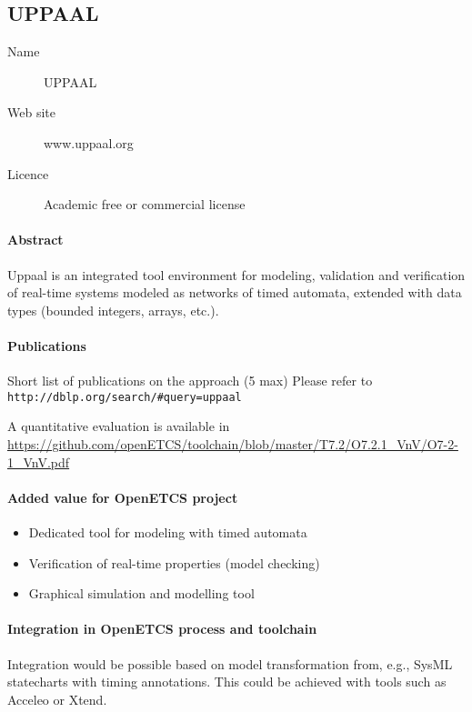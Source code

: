 \subsection{UPPAAL}
\label{sec: UPPAALL}

\begin{description}
\item[Name] UPPAAL
\item[Web site] www.uppaal.org
\item[Licence] Academic free or commercial license
\end{description}

\paragraph{Abstract} Uppaal is an integrated tool environment for modeling, validation and verification of real-time systems modeled as networks of timed automata, extended with data types (bounded integers, arrays, etc.).

\paragraph{Publications} Short list of publications on the approach (5 max)
Please refer to \verb|http://dblp.org/search/#query=uppaal|



A quantitative evaluation is available in \url{https://github.com/openETCS/toolchain/blob/master/T7.2/O7.2.1_VnV/O7-2-1_VnV.pdf}


\paragraph{Added value for OpenETCS project}

\begin{itemize}
  \item Dedicated tool for modeling with timed automata
  \item Verification of real-time properties (model checking)
  \item Graphical simulation and modelling tool
\end{itemize}


\paragraph{Integration in OpenETCS process and toolchain}

Integration would be possible based on model transformation from, e.g., SysML statecharts with timing annotations. This could be achieved with tools such as Acceleo or Xtend.

